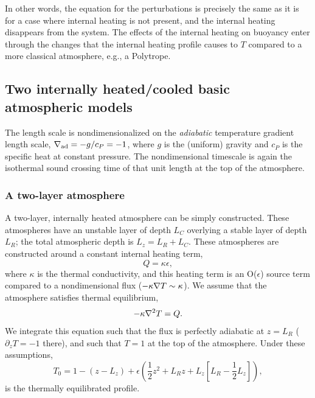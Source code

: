 In other words, the equation for the perturbations is precisely the same as it is for a case where internal heating is not present, and the internal heating disappears from the system.
The effects of the internal heating on buoyancy enter through the changes that the internal heating profile causes to $T$ compared to a more classical atmosphere, e.g., a Polytrope.



\subsection{Two internally heated/cooled basic atmospheric models}
\label{sec:atmospheres}
The length scale is nondimensionalized on the \emph{adiabatic} temperature gradient length scale, $\nabla_{\text{ad}} = -g/c_P = -1$, where $g$ is the (uniform) gravity and $c_P$ is the specific heat at constant pressure.
The nondimensional timescale is again the isothermal sound crossing time of that unit length at the top of the atmosphere.

\subsubsection{A two-layer atmosphere}
A two-layer, internally heated atmosphere can be simply constructed.
These atmospheres have an unstable layer of depth $L_C$ overlying a stable layer of depth $L_R$; the total atmospheric depth is $L_z = L_R + L_C$.
These atmospheres are constructed around a constant internal heating term,
\begin{equation}
Q = \kappa \epsilon,
\end{equation}
where $\kappa$ is the thermal conductivity, and this heating term is an O($\epsilon$) source term compared to a nondimensional flux ($-\kappa\nabla T \sim \kappa$).
We assume that the atmosphere satisfies thermal equilibrium,
$$
-\kappa \nabla^2 T = Q.
$$
We integrate this equation such that the flux is perfectly adiabatic at $z = L_R$ ($\partial_z T = -1$ there), and such that $T = 1$ at the top of the atmosphere.
Under these assumptions,
\begin{equation}
T_0 = 1 - (z - L_z) + \epsilon\left(\frac{1}{2} z^2 + L_R z + L_z \left[L_R - \frac{1}{2}L_z\right]\right),
\end{equation}
is the thermally equilibrated profile.




